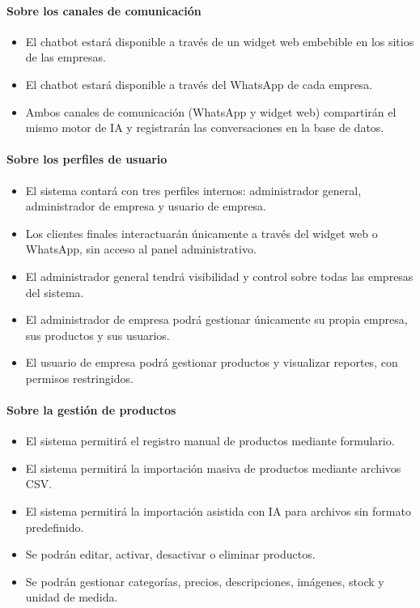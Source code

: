 \paragraph{Sobre los canales de comunicación}
\begin{itemize}
    \item El chatbot estará disponible a través de un widget web embebible en los sitios de las empresas.
    \item El chatbot estará disponible a través del WhatsApp de cada empresa.
    \item Ambos canales de comunicación (WhatsApp y widget web) compartirán el mismo motor de IA y registrarán las conversaciones en la base de datos.
\end{itemize}
\paragraph{Sobre los perfiles de usuario}
\begin{itemize}
    \item El sistema contará con tres perfiles internos: administrador general, administrador de empresa y usuario de empresa.
    \item Los clientes finales interactuarán únicamente a través del widget web o WhatsApp, sin acceso al panel administrativo.
    \item El administrador general tendrá visibilidad y control sobre todas las empresas del sistema.
    \item El administrador de empresa podrá gestionar únicamente su propia empresa, sus productos y sus usuarios.
    \item El usuario de empresa podrá gestionar productos y visualizar reportes, con permisos restringidos.
\end{itemize}
\paragraph{Sobre la gestión de productos}
\begin{itemize}
    \item El sistema permitirá el registro manual de productos mediante formulario.
    \item El sistema permitirá la importación masiva de productos mediante archivos CSV.
    \item El sistema permitirá la importación asistida con IA para archivos sin formato predefinido.
    \item Se podrán editar, activar, desactivar o eliminar productos.
    \item Se podrán gestionar categorías, precios, descripciones, imágenes, stock y unidad de medida.
\end{itemize}
